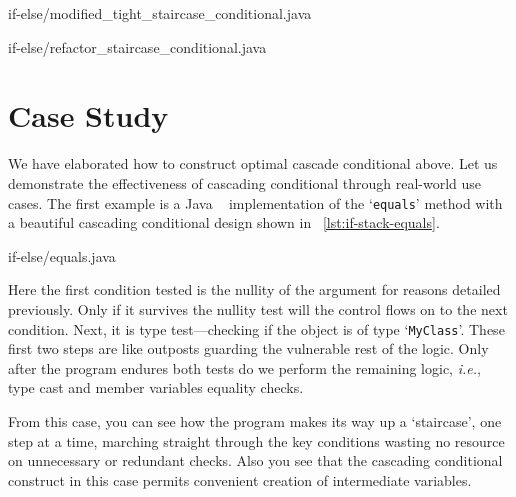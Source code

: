 \documentclass[oneside,11pt]{book}
\theoremstyle{definition}
\theoremstyle{remark}
\newcommand{\code}[1]{\mbox{\lstinline{#1}}}
\newcommand{\java}{Java }
\begin{document}
\begin{clisting}
    \begin{minipage}[t]{.4\textwidth}
        
        {if-else/modified_tight_staircase_conditional.java}
    \end{minipage}
    \hfill
    \begin{minipage}[t]{.4\textwidth}
        
        {if-else/refactor_staircase_conditional.java}
    \end{minipage}
\end{clisting}

\section{Case Study}\label{sec:casestudy-cascif}


We have elaborated how to construct optimal cascade conditional above.
Let us demonstrate the effectiveness of cascading conditional through real-world use cases.
The first example is a \java~ implementation of the `\code{equals}' method with a
beautiful cascading conditional design shown in ~\autoref{lst:if-stack-equals}.
\begin{clisting}
    
    {if-else/equals.java}
\end{clisting}
Here the first condition tested is the nullity of the argument for reasons detailed previously.
Only if it survives the nullity test will the control flows on to the next condition.
Next, it is type test---checking if the object is of type `\code{MyClass}'.
These first two steps are like outposts guarding the vulnerable rest of the logic.
Only after the program endures both tests do we perform the remaining logic, \textit{i.e.}, type
cast and member variables equality checks.

From this case, you can see how the program makes its way up a `staircase', one step at a time,
marching straight through the key conditions wasting no resource on unnecessary or redundant checks.
Also you see that the cascading conditional construct in this case permits
convenient creation of intermediate variables.
\end{document}
